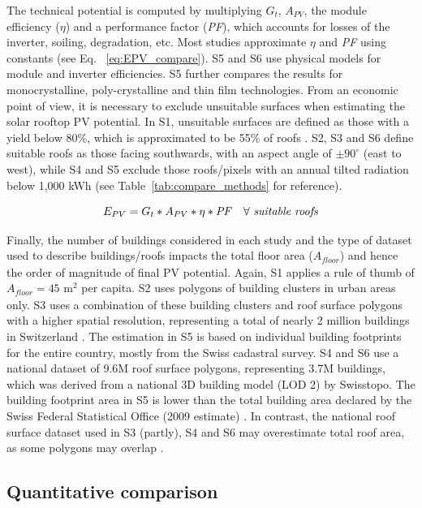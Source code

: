 The technical potential is computed by multiplying $G_t$, $A_{PV}$, the module efficiency ($\eta$) and a performance factor (\textit{PF}), which accounts for losses of the inverter, soiling, degradation, etc. Most studies approximate $\eta$ and \textit{PF} using constants (see Eq. ~\ref{eq:EPV_compare}). S5 and S6 use physical models for module and inverter efficiencies. S5 further compares the results for monocrystalline, poly-crystalline and thin film technologies. From an economic point of view, it is necessary to exclude unsuitable surfaces when estimating the solar rooftop PV potential. In S1, unsuitable surfaces are defined as those with a yield below 80\%, which is approximated to be 55\% of roofs \cite{iea_potential_2002}. S2, S3 and S6 define suitable roofs as those facing southwards, with an aspect angle of $\pm 90^\circ$ (east to west), while S4 and S5 exclude those roofs/pixels with an annual tilted radiation below 1,000 kWh (see Table~\ref{tab:compare_methods} for reference).

\begin{equation}
\label{eq:EPV_compare}
    E_{PV} = G_t * A_{PV} * \eta * \mathit{PF} \quad \forall \ \text{\textit{suitable roofs}}
\end{equation}

Finally, the number of buildings considered in each study and the type of dataset used to describe buildings/roofs impacts the total floor area ($A_{\mathit{floor}}$) and hence the order of magnitude of final PV potential. Again, S1 applies a rule of thumb of $A_{\mathit{floor}} = 45$ m$^2$ per capita. S2 uses polygons of building clusters in urban areas only. S3 uses a combination of these building clusters and roof surface polygons with a higher spatial resolution, representing a total of nearly 2 million buildings in Switzerland \cite{assouline_large-scale_2018}. The estimation in S5 is based on individual building footprints for the entire country, mostly from the Swiss cadastral survey. S4 and S6 use a national dataset of 9.6M roof surface polygons, representing 3.7M buildings, which was derived from a national 3D building model (LOD 2) by Swisstopo. The building footprint area in S5 is lower than the total building area declared by the Swiss Federal Statistical Office (2009 estimate) \cite{buffat_scalable_2018}. In contrast, the national roof surface dataset used in S3 (partly), S4 and S6 may overestimate total roof area, as some polygons may overlap \cite{swisstopo_swisstlm3d_2018}.

\subsection{Quantitative comparison}

